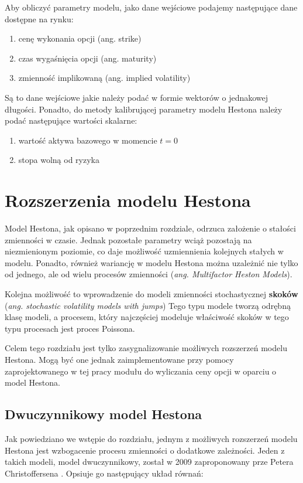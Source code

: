 \documentclass{pracamgr}
\begin{document}
Aby obliczyć parametry modelu, jako dane wejściowe podajemy następujące dane dostępne na rynku:
\begin{enumerate}
  \item cenę wykonania opcji (ang. strike)
  \item czas wygaśnięcia opcji (ang. maturity)
  \item zmienność implikowaną (ang. implied volatility)
\end{enumerate}
Są to dane wejściowe jakie należy podać w formie wektorów o jednakowej długości.
Ponadto, do metody kalibrującej parametry modelu Hestona należy podać następujące 
wartości skalarne:
\begin{enumerate}
  \item wartość aktywa bazowego w momencie $t=0$
  \item stopa wolną od ryzyka
\end{enumerate}

\chapter{Rozszerzenia modelu Hestona}

Model Hestona, jak opisano w poprzednim rozdziale, odrzuca założenie o stałości zmienności w czasie. 
Jednak pozostałe parametry wciąż pozostają na niezmienionym poziomie, co daje możliwość uzmiennienia
kolejnych stałych w modelu.
Ponadto, również wariancję w modelu Hestona można uzależnić nie tylko 
od jednego, ale od wielu procesów zmienności (\textit{ang. Multifactor Heston Models}).

Kolejna możliwość to wprowadzenie do modeli zmienności stochastycznej \textbf{skoków} (\textit{ang. stochastic volatility models with jumps})
Tego typu modele tworzą odrębną klasę modeli, a procesem, który najczęściej modeluje właściwość
skoków w tego typu procesach jest proces Poissona.

Celem tego rozdziału jest tylko zasygnalizowanie możliwych rozszerzeń modelu Hestona.
Mogą być one jednak zaimplementowane przy pomocy zaprojektowanego w tej pracy modułu 
do wyliczania ceny opcji w oparciu o model Hestona. 

\section{Dwuczynnikowy model Hestona} %
\label{sec:modelDwuczynnikowy}
Jak powiedziano we wstępie do rozdziału, jednym z możliwych rozszerzeń modelu Hestona jest wzbogacenie
procesu zmienności o dodatkowe zależności. 
Jeden z takich modeli, model dwuczynnikowy, został w 2009 zaproponowany prze
Petera Christoffersena  \cite{Christoffersen}.
Opsiuje go następujący układ równań:
\end{document}
